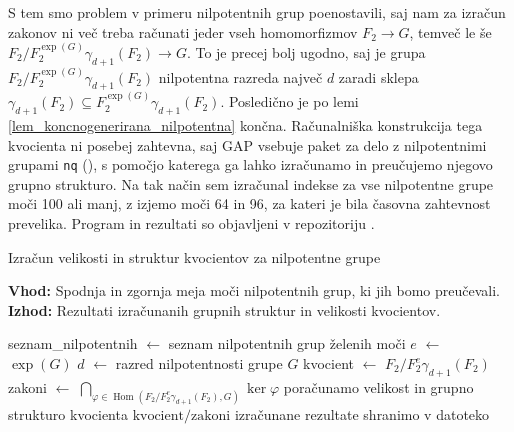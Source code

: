 S tem smo problem v primeru nilpotentnih grup poenostavili, saj nam za izračun zakonov ni več treba računati jeder vseh homomorfizmov $F_2 \to G$, temveč le še $F_2 / F_2^{\exp(G)}\gamma_{d+1}(F_2) \to G$.
To je precej bolj ugodno, saj je grupa $F_2 / F_2^{\exp(G)}\gamma_{d+1}(F_2)$ nilpotentna razreda največ $d$ zaradi sklepa $\gamma_{d+1}(F_2) \subseteq  F_2^{\exp(G)}\gamma_{d+1}(F_2)$.
Posledično je po lemi \ref{lem_koncnogenerirana_nilpotentna} končna.
Računalniška konstrukcija tega kvocienta ni posebej zahtevna, saj GAP vsebuje paket za delo z nilpotentnimi grupami \texttt{nq} (\cite{nq2.5.11}), s pomočjo katerega ga lahko izračunamo in preučujemo njegovo grupno strukturo.
Na tak način sem izračunal indekse za vse nilpotentne grupe moči 100 ali manj, z izjemo moči 64 in 96, za kateri je bila časovna zahtevnost prevelika. Program in rezultati so objavljeni v repozitoriju \cite{repo_2024}. 

\begin{algorithm}[ht]
    \caption{Izračun velikosti in struktur kvocientov za nilpotentne grupe}
    \label{alg_nilpotentne_grupe}
    \raggedright
    \textbf{Vhod:} Spodnja in zgornja meja moči nilpotentnih grup, ki jih bomo preučevali. \\
    \textbf{Izhod:} Rezultati izračunanih grupnih struktur in velikosti kvocientov.
  
    \begin{algorithmic}[1]
      \State seznam\_nilpotentnih $\gets$ seznam nilpotentnih grup želenih moči
        \State $e$ $\gets$ $\exp(G)$
        \State $d$ $\gets$ razred nilpotentnosti grupe $G$
        \State kvocient $\gets$ $F_2 / F_2^{e}\gamma_{d+1}(F_2)$
        \State zakoni $\gets$ $\bigcap\limits_{\varphi \in \operatorname{Hom}({F_2} / {F_2^{e}\gamma_{d+1}(F_2)}, G)} \ker \varphi$
        \State poračunamo velikost in grupno strukturo kvocienta $\text{kvocient}/\text{zakoni}$
      \EndFor
      \State izračunane rezultate shranimo v datoteko
    \end{algorithmic}
  \end{algorithm}

